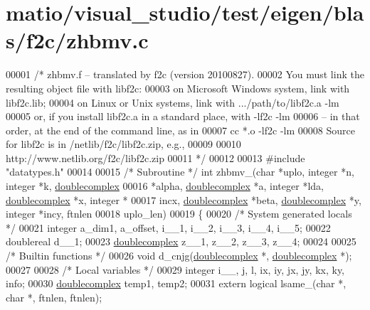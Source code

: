 \hypertarget{matio_2visual__studio_2test_2eigen_2blas_2f2c_2zhbmv_8c_source}{}\section{matio/visual\+\_\+studio/test/eigen/blas/f2c/zhbmv.c}
\label{matio_2visual__studio_2test_2eigen_2blas_2f2c_2zhbmv_8c_source}

\begin{DoxyCode}
00001 \textcolor{comment}{/* zhbmv.f -- translated by f2c (version 20100827).}
00002 \textcolor{comment}{   You must link the resulting object file with libf2c:}
00003 \textcolor{comment}{    on Microsoft Windows system, link with libf2c.lib;}
00004 \textcolor{comment}{    on Linux or Unix systems, link with .../path/to/libf2c.a -lm}
00005 \textcolor{comment}{    or, if you install libf2c.a in a standard place, with -lf2c -lm}
00006 \textcolor{comment}{    -- in that order, at the end of the command line, as in}
00007 \textcolor{comment}{        cc *.o -lf2c -lm}
00008 \textcolor{comment}{    Source for libf2c is in /netlib/f2c/libf2c.zip, e.g.,}
00009 \textcolor{comment}{}
00010 \textcolor{comment}{        http://www.netlib.org/f2c/libf2c.zip}
00011 \textcolor{comment}{*/}
00012 
00013 \textcolor{preprocessor}{#include "datatypes.h"}
00014 
00015 \textcolor{comment}{/* Subroutine */} \textcolor{keywordtype}{int} zhbmv\_(\textcolor{keywordtype}{char} *uplo, integer *n, integer *k, \hyperlink{structdoublecomplex}{doublecomplex} 
00016     *alpha, \hyperlink{structdoublecomplex}{doublecomplex} *a, integer *lda, \hyperlink{structdoublecomplex}{doublecomplex} *x, integer *
00017     incx, \hyperlink{structdoublecomplex}{doublecomplex} *beta, \hyperlink{structdoublecomplex}{doublecomplex} *y, integer *incy, ftnlen 
00018     uplo\_len)
00019 \{
00020     \textcolor{comment}{/* System generated locals */}
00021     integer a\_dim1, a\_offset, i\_\_1, i\_\_2, i\_\_3, i\_\_4, i\_\_5;
00022     doublereal d\_\_1;
00023     \hyperlink{structdoublecomplex}{doublecomplex} z\_\_1, z\_\_2, z\_\_3, z\_\_4;
00024 
00025     \textcolor{comment}{/* Builtin functions */}
00026     \textcolor{keywordtype}{void} d\_cnjg(\hyperlink{structdoublecomplex}{doublecomplex} *, \hyperlink{structdoublecomplex}{doublecomplex} *);
00027 
00028     \textcolor{comment}{/* Local variables */}
00029     integer i\_\_, j, l, ix, iy, jx, jy, kx, ky, info;
00030     \hyperlink{structdoublecomplex}{doublecomplex} temp1, temp2;
00031     \textcolor{keyword}{extern} logical lsame\_(\textcolor{keywordtype}{char} *, \textcolor{keywordtype}{char} *, ftnlen, ftnlen);

\end{DoxyCode}
